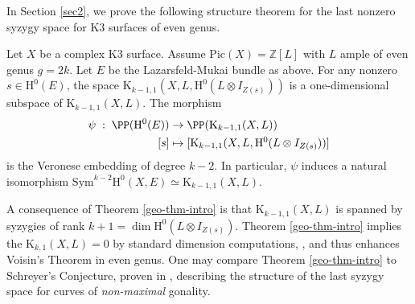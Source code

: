 In Section \ref{sec2}, we prove the following structure theorem for the last nonzero syzygy space for K3 surfaces of even genus.
\begin{thm}
\notready \label{geo-thm-intro}
Let $X$ be a complex K3 surface. Assume $\mathrm{Pic}(X)=\mathbb{Z}[L]$ with $L$ ample of even genus $g=2k$. Let $E$ be the Lazarsfeld-Mukai bundle as above. For any nonzero $s \in \mathrm{H}^0(E)$, the space $\mathrm{K}_{k-1,1}(X,L,\mathrm{H}^0(L \otimes I_{Z(s)}))$ is a one-dimensional subspace of $\mathrm{K}_{k-1,1}(X,L)$.
The morphism
{\small{\begin{align*}
\psi \; : \; \PP(\mathrm{H}^0(E)) & \to \PP(\mathrm{K}_{k-1,1}(X,L))\\
[s] & \mapsto [\mathrm{K}_{k-1,1}(X,L,\mathrm{H}^0(L \otimes I_{Z(s)}))]
\end{align*}}}
is the Veronese embedding of degree $k-2$. In particular, $\psi$ induces a natural isomorphism $\mathrm{Sym}^{k-2}\mathrm{H}^0(X,E) \simeq \mathrm{K}_{k-1,1}(X,L) $.
\end{thm}
A consequence of Theorem \ref{geo-thm-intro} is that $\mathrm{K}_{k-1,1}(X,L)$ is spanned by syzygies of rank $k+1=\dim \mathrm{H}^0(L \otimes I_{Z(s)})$. Theorem \ref{geo-thm-intro} implies the $\mathrm{K}_{k,1}(X,L)=0$ by standard dimension computations, \cite[\S 4.1]{farkas-progress}, and thus enhances Voisin's Theorem in even genus. One may compare Theorem \ref{geo-thm-intro} to Schreyer's Conjecture, proven in \cite{lin-syz}, describing the structure of the last syzygy space for curves of \emph{non-maximal} gonality.


